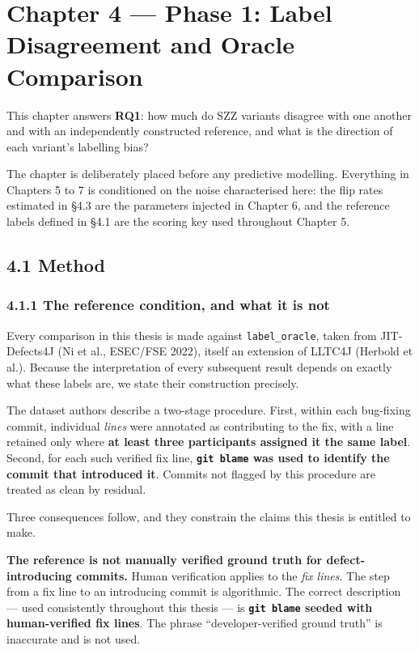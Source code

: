 \chapter{Chapter 4 --- Phase 1: Label Disagreement and Oracle
Comparison}\label{chapter-4-phase-1-label-disagreement-and-oracle-comparison}

This chapter answers \textbf{RQ1}: how much do SZZ variants disagree
with one another and with an independently constructed reference, and
what is the direction of each variant's labelling bias?

The chapter is deliberately placed before any predictive modelling.
Everything in Chapters 5 to 7 is conditioned on the noise characterised
here: the flip rates estimated in \S{}4.3 are the parameters injected in
Chapter 6, and the reference labels defined in \S{}4.1 are the scoring key
used throughout Chapter 5.

\section{4.1 Method}\label{method}

\subsection{4.1.1 The reference condition, and what it is
not}\label{the-reference-condition-and-what-it-is-not}

Every comparison in this thesis is made against \texttt{label\_oracle},
taken from JIT-Defects4J (Ni et al., ESEC/FSE 2022), itself an extension
of LLTC4J (Herbold et al.). Because the interpretation of every
subsequent result depends on exactly what these labels are, we state
their construction precisely.

The dataset authors describe a two-stage procedure. First, within each
bug-fixing commit, individual \emph{lines} were annotated as
contributing to the fix, with a line retained only where \textbf{at
least three participants assigned it the same label}. Second, for each
such verified fix line, \textbf{\texttt{git\ blame} was used to identify
the commit that introduced it}. Commits not flagged by this procedure
are treated as clean by residual.

Three consequences follow, and they constrain the claims this thesis is
entitled to make.

\textbf{The reference is not manually verified ground truth for
defect-introducing commits.} Human verification applies to the \emph{fix
lines}. The step from a fix line to an introducing commit is
algorithmic. The correct description --- used consistently throughout
this thesis --- is \textbf{\texttt{git\ blame} seeded with
human-verified fix lines}. The phrase ``developer-verified ground
truth'' is inaccurate and is not used.

